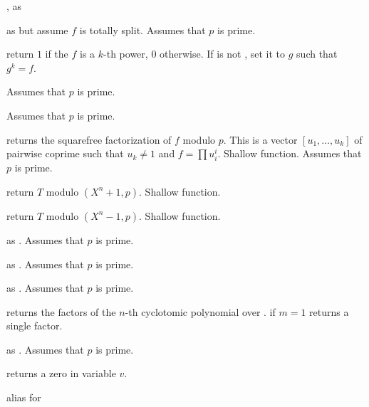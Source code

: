 , as 

 as  but
assume $f$ is totally split. Assumes that $p$ is prime.


return $1$ if the  $f$ is a $k$-th power, $0$ otherwise.
If  is not , set it to $g$ such that $g^k = f$.

 Assumes that $p$ is prime.

 Assumes that $p$ is prime.


 returns the squarefree
factorization of $f$ modulo $p$. This is a vector $[u_1,\dots,u_k]$
of pairwise coprime  such that $u_k \neq 1$ and $f = \prod u_i^i$.
Shallow function. Assumes that $p$ is prime.


 return $T$ modulo
$(X^n + 1, p)$. Shallow function.

 return $T$ modulo
$(X^n - 1, p)$. Shallow function.

 as . Assumes that $p$
is prime.

 as
. Assumes that $p$ is prime.

 as .
Assumes that $p$ is prime.

 returns the factors
of the $n$-th cyclotomic polynomial over . if $m=1$ returns
a single factor.

 as .
Assumes that $p$ is prime.


 returns a zero  in variable $v$.

 alias for 

